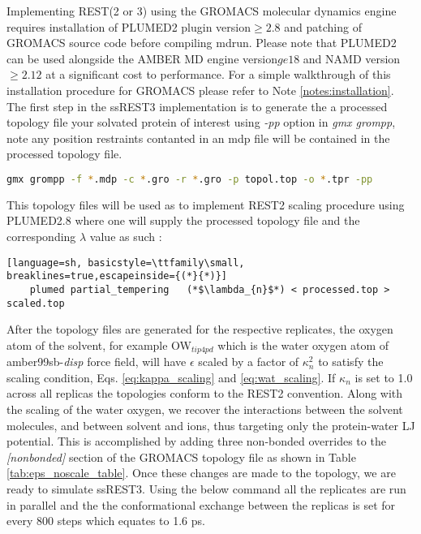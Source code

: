 
Implementing REST(2 or 3) using the GROMACS\cite{VanDerSpoel2005} molecular dynamics engine requires installation of PLUMED2 plugin version$\ge2.8$ and patching of GROMACS source code before compiling mdrun. Please note that PLUMED2 can be used alongside the AMBER MD engine version$ge18$ and NAMD version$\ge2.12$ at a significant cost to performance. For a simple walkthrough of this installation procedure for GROMACS please refer to Note \ref{notes:installation}.
The first step in the ssREST3 implementation is to generate the a processed topology file your solvated protein of interest using \textit{-pp} option in \textit{gmx grompp}, note any position restraints contanted in an mdp file will be contained in the processed topology file.

\begin{lstlisting}[language=sh, basicstyle=\ttfamily\small, breaklines=true]
    gmx grompp -f *.mdp -c *.gro -r *.gro -p topol.top -o *.tpr -pp
\end{lstlisting}

\noindent This topology files will be used as to implement REST2 scaling procedure using PLUMED2.8 where one will supply the processed topology file and the corresponding $\lambda$ value as such :

\begin{lstlisting}[language=sh, basicstyle=\ttfamily\small, breaklines=true,escapeinside={(*}{*)}]
    plumed partial_tempering   (*$\lambda_{n}$*) < processed.top > scaled.top
\end{lstlisting}

After the topology files are generated for the respective replicates, the oxygen atom 
of the solvent, for example OW$_{tip4pd}$ which is the water oxygen atom of amber99sb-\textit{disp} force field, will have $\epsilon$ scaled by a factor of $\kappa^{2}_{n}$ to satisfy the scaling condition, 
 Eqs. \ref{eq:kappa_scaling} and \ref{eq:wat_scaling}. 
If $\kappa_{n}$ is set to 1.0 across all replicas the topologies conform to the REST2 convention. 
Along with the scaling of the water oxygen, we recover the interactions between the solvent molecules, and between solvent and ions, thus targeting only the protein-water LJ potential. 
This is accomplished by adding three non-bonded overrides to the \textit{[nonbonded]} section of the GROMACS topology file as shown in Table \ref{tab:eps_noscale_table}.
Once these changes are made to the topology, we are ready to simulate ssREST3.
Using the below command all the replicates are run in parallel and the the conformational exchange between the replicas is set for every 800 steps which equates to 1.6 ps.

